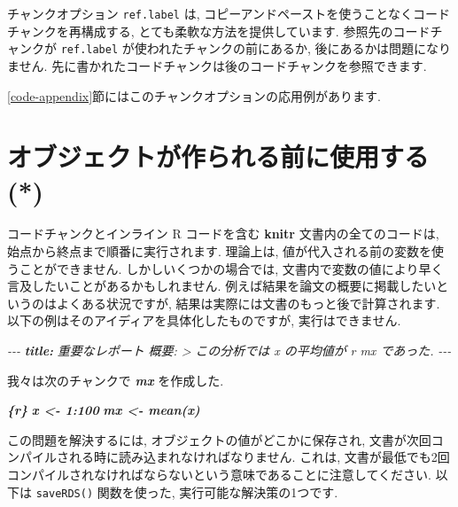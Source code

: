\documentclass[
  11pt,
]{bxjsreport}
\newenvironment{Shaded}{\begin{snugshade}}{\end{snugshade}}
\newcommand{\AnnotationTok}[1]{\textcolor[rgb]{0.56,0.35,0.01}{\textbf{\textit{#1}}}}
\newcommand{\CommentTok}[1]{\textcolor[rgb]{0.56,0.35,0.01}{\textit{#1}}}
\newcommand{\InformationTok}[1]{\textcolor[rgb]{0.56,0.35,0.01}{\textbf{\textit{#1}}}}
\newcommand{\NormalTok}[1]{#1}
\begin{document}
チャンクオプション \texttt{ref.label} は, コピーアンドペーストを使うことなくコードチャンクを再構成する, とても柔軟な方法を提供しています. 参照先のコードチャンクが \texttt{ref.label} が使われたチャンクの前にあるか, 後にあるかは問題になりません. 先に書かれたコードチャンクは後のコードチャンクを参照できます.

\ref{code-appendix}節にはこのチャンクオプションの応用例があります.

\hypertarget{load-cache}{%
\section{オブジェクトが作られる前に使用する (*)}\label{load-cache}}

コードチャンクとインライン R コードを含む \textbf{knitr} 文書内の全てのコードは, 始点から終点まで順番に実行されます. 理論上は, 値が代入される前の変数を使うことができません. しかしいくつかの場合では, 文書内で変数の値により早く言及したいことがあるかもしれません. 例えば結果を論文の概要に掲載したいというのはよくある状況ですが, 結果は実際には文書のもっと後で計算されます. 以下の例はそのアイディアを具体化したものですが, 実行はできません.

\begin{Shaded}
\begin{Highlighting}[]
\CommentTok{{-}{-}{-}}
\AnnotationTok{title:}\CommentTok{ 重要なレポート}
\CommentTok{概要: \textgreater{}}
\CommentTok{  この分析では \textasciigrave{}x\textasciigrave{} の平均値が}
\CommentTok{  \textasciigrave{}r mx\textasciigrave{} であった.}
\CommentTok{{-}{-}{-}}

\NormalTok{我々は次のチャンクで }\InformationTok{\textasciigrave{}mx\textasciigrave{}}\NormalTok{ を作成した.}

\InformationTok{\textasciigrave{}\textasciigrave{}\textasciigrave{}\{r\}}
\InformationTok{x \textless{}{-} 1:100}
\InformationTok{mx \textless{}{-} mean(x)}
\InformationTok{\textasciigrave{}\textasciigrave{}\textasciigrave{}}
\end{Highlighting}
\end{Shaded}

この問題を解決するには, オブジェクトの値がどこかに保存され, 文書が次回コンパイルされる時に読み込まれなければなりません. これは, 文書が最低でも2回コンパイルされなければならないという意味であることに注意してください. 以下は \texttt{saveRDS()} 関数を使った, 実行可能な解決策の1つです.
\end{document}
